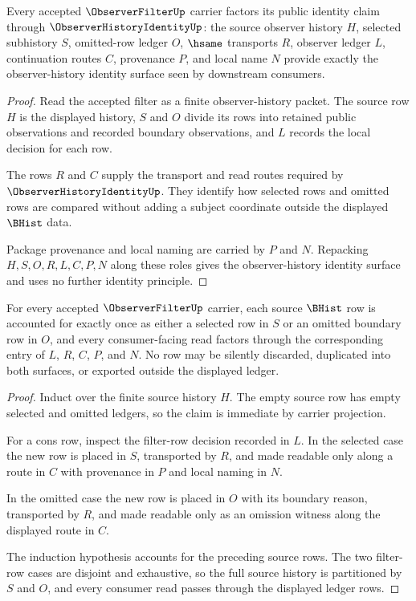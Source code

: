 \begin{theorem}
\label{thm:observer-filter-observer-history-factorization}
Every accepted $\ObserverFilterUp$ carrier factors its public identity claim through $\ObserverHistoryIdentityUp$: the source observer history $H$, selected subhistory $S$, omitted-row ledger $O$, $\hsame$ transports $R$, observer ledger $L$, continuation routes $C$, provenance $P$, and local name $N$ provide exactly the observer-history identity surface seen by downstream consumers.
\end{theorem}
\begin{proof}
Read the accepted filter as a finite observer-history packet. The source row $H$ is the displayed history, $S$ and $O$ divide its rows into retained public observations and recorded boundary observations, and $L$ records the local decision for each row.

The rows $R$ and $C$ supply the transport and read routes required by $\ObserverHistoryIdentityUp$. They identify how selected rows and omitted rows are compared without adding a subject coordinate outside the displayed $\BHist$ data.

Package provenance and local naming are carried by $P$ and $N$. Repacking $H,S,O,R,L,C,P,N$ along these roles gives the observer-history identity surface and uses no further identity principle.
\end{proof}

\begin{theorem}
\label{thm:observer-filter-ledger-exactness}
For every accepted $\ObserverFilterUp$ carrier, each source $\BHist$ row is accounted for exactly once as either a selected row in $S$ or an omitted boundary row in $O$, and every consumer-facing read factors through the corresponding entry of $L$, $R$, $C$, $P$, and $N$. No row may be silently discarded, duplicated into both surfaces, or exported outside the displayed ledger.
\end{theorem}
\begin{proof}
Induct over the finite source history $H$. The empty source row has empty selected and omitted ledgers, so the claim is immediate by carrier projection.

For a cons row, inspect the filter-row decision recorded in $L$. In the selected case the new row is placed in $S$, transported by $R$, and made readable only along a route in $C$ with provenance in $P$ and local naming in $N$.

In the omitted case the new row is placed in $O$ with its boundary reason, transported by $R$, and made readable only as an omission witness along the displayed route in $C$.

The induction hypothesis accounts for the preceding source rows. The two filter-row cases are disjoint and exhaustive, so the full source history is partitioned by $S$ and $O$, and every consumer read passes through the displayed ledger rows.
\end{proof}

